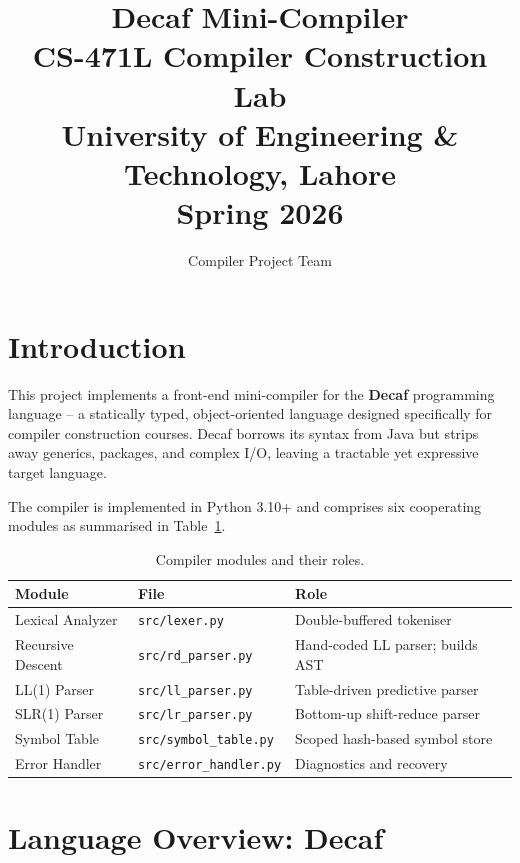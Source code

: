 \documentclass[12pt,a4paper]{article}
\title{\textbf{Decaf Mini-Compiler}\\
       \large CS-471L Compiler Construction Lab\\
       University of Engineering \& Technology, Lahore\\
       Spring 2026}
\author{Compiler Project Team}
\date{}
\begin{document}
\maketitle
\tableofcontents
\newpage

\section{Introduction}

This project implements a front-end mini-compiler for the \textbf{Decaf}
programming language -- a statically typed, object-oriented language designed
specifically for compiler construction courses. Decaf borrows its syntax from
Java but strips away generics, packages, and complex I/O, leaving a tractable
yet expressive target language.

The compiler is implemented in Python 3.10+ and comprises six cooperating
modules as summarised in Table~\ref{tab:modules}.

\begin{table}[h]
\centering
\begin{tabular}{lll}
\toprule
\textbf{Module} & \textbf{File} & \textbf{Role} \\
\midrule
Lexical Analyzer  & \texttt{src/lexer.py}        & Double-buffered tokeniser \\
Recursive Descent & \texttt{src/rd\_parser.py}   & Hand-coded LL parser; builds AST \\
LL(1) Parser      & \texttt{src/ll\_parser.py}   & Table-driven predictive parser \\
SLR(1) Parser     & \texttt{src/lr\_parser.py}   & Bottom-up shift-reduce parser \\
Symbol Table      & \texttt{src/symbol\_table.py}& Scoped hash-based symbol store \\
Error Handler     & \texttt{src/error\_handler.py}& Diagnostics and recovery \\
\bottomrule
\end{tabular}
\caption{Compiler modules and their roles.}
\label{tab:modules}
\end{table}

\section{Language Overview: Decaf}
\end{document}
